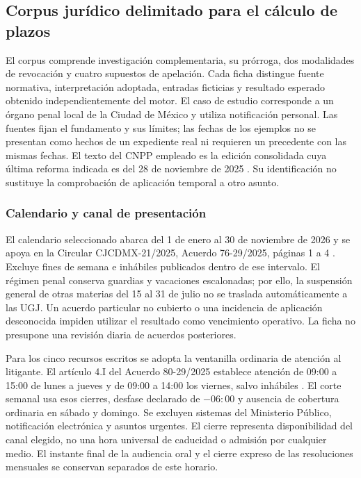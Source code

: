 \subsection{Corpus jurídico delimitado para el cálculo de plazos}\label{sec:pruebas-corpus-juridico}

El corpus comprende investigación complementaria, su prórroga, dos modalidades de revocación y cuatro supuestos de apelación. Cada ficha distingue fuente normativa, interpretación adoptada, entradas ficticias y resultado esperado obtenido independientemente del motor. El caso de estudio corresponde a un órgano penal local de la Ciudad de México y utiliza notificación personal. Las fuentes fijan el fundamento y sus límites; las fechas de los ejemplos no se presentan como hechos de un expediente real ni requieren un precedente con las mismas fechas. El texto del CNPP empleado es la edición consolidada cuya última reforma indicada es del 28 de noviembre de 2025 \cite{cnpp_consolidado2025}. Su identificación no sustituye la comprobación de aplicación temporal a otro asunto.

\subsubsection{Calendario y canal de presentación}

El calendario seleccionado abarca del 1 de enero al 30 de noviembre de 2026 y se apoya en la Circular CJCDMX-21/2025, Acuerdo 76-29/2025, páginas 1 a 4 \cite{cjcdmx_calendario2026}. Excluye fines de semana e inhábiles publicados dentro de ese intervalo. El régimen penal conserva guardias y vacaciones escalonadas; por ello, la suspensión general de otras materias del 15 al 31 de julio no se traslada automáticamente a las UGJ. Un acuerdo particular no cubierto o una incidencia de aplicación desconocida impiden utilizar el resultado como vencimiento operativo. La ficha no presupone una revisión diaria de acuerdos posteriores.

Para los cinco recursos escritos se adopta la ventanilla ordinaria de atención al litigante. El artículo 4.I del Acuerdo 80-29/2025 establece atención de 09:00 a 15:00 de lunes a jueves y de 09:00 a 14:00 los viernes, salvo inhábiles \cite{cjcdmx_ugj2025}. El corte semanal usa esos cierres, desfase declarado de $-06{:}00$ y ausencia de cobertura ordinaria en sábado y domingo. Se excluyen sistemas del Ministerio Público, notificación electrónica y asuntos urgentes. El cierre representa disponibilidad del canal elegido, no una hora universal de caducidad o admisión por cualquier medio. El instante final de la audiencia oral y el cierre expreso de las resoluciones mensuales se conservan separados de este horario.


